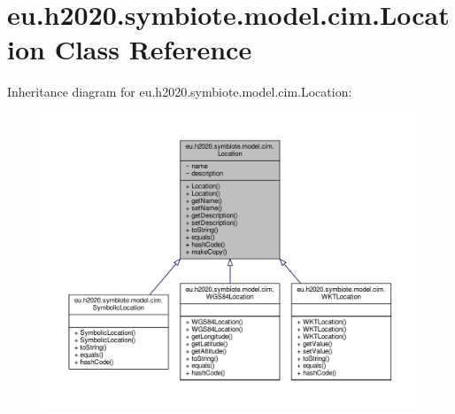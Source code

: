 \hypertarget{classeu_1_1h2020_1_1symbiote_1_1model_1_1cim_1_1Location}{}\section{eu.\+h2020.\+symbiote.\+model.\+cim.\+Location Class Reference}
\label{classeu_1_1h2020_1_1symbiote_1_1model_1_1cim_1_1Location}


Inheritance diagram for eu.\+h2020.\+symbiote.\+model.\+cim.\+Location\+:
\nopagebreak
\begin{figure}[H]
\begin{center}
\leavevmode
\includegraphics[width=350pt]{classeu_1_1h2020_1_1symbiote_1_1model_1_1cim_1_1Location__inherit__graph}
\end{center}
\end{figure}


